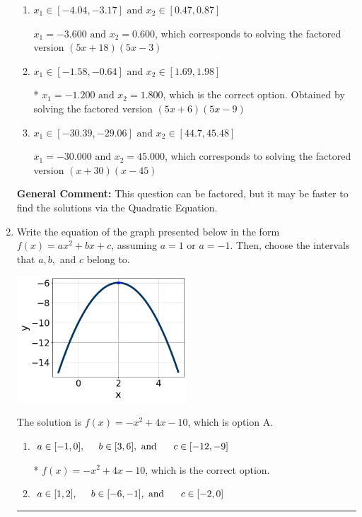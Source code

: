 \documentclass{extbook}[14pt]
\newcommand{\litem}[1]{\item #1

\rule{\textwidth}{0.4pt}}
\begin{document}
\begin{enumerate}
{\begin{enumerate}[label=\Alph*.]
$x_1 = -0.600 \text{ and } x_2 = 3.600$, which corresponds to solving the factored version $(5x + 3)(5x -18)$
\item \( x_1 \in [-4.04, -3.17] \text{ and } x_2 \in [0.47, 0.87] \)

$x_1 = -3.600 \text{ and } x_2 = 0.600$, which corresponds to solving the factored version $(5x + 18)(5x -3)$
\item \( x_1 \in [-1.58, -0.64] \text{ and } x_2 \in [1.69, 1.98] \)

* $x_1 = -1.200 \text{ and } x_2 = 1.800$, which is the correct option. Obtained by solving the factored version $(5x + 6)(5x -9)$
\item \( x_1 \in [-30.39, -29.06] \text{ and } x_2 \in [44.7, 45.48] \)

$x_1 = -30.000 \text{ and } x_2 = 45.000$, which corresponds to solving the factored version $(x + 30)(x -45)$
\end{enumerate}

\textbf{General Comment:} This question can be factored, but it may be faster to find the solutions via the Quadratic Equation.
}
\litem{
Write the equation of the graph presented below in the form $f(x)=ax^2+bx+c$, assuming  $a=1$ or $a=-1$. Then, choose the intervals that $a, b,$ and $c$ belong to.

\begin{center}
    \includegraphics[width=0.5\textwidth]{../Figures/quadraticGraphToEquationCopyA.png}
\end{center}


The solution is \( f(x) = -x^{2} +4 x -10 \), which is option A.\begin{enumerate}[label=\Alph*.]
\item \( a \in [-1, 0], \hspace*{5mm} b \in [3, 6], \text{ and } \hspace*{5mm} c \in [-12, -9] \)

* $f(x)=-x^{2} +4 x -10$, which is the correct option.
\item \( a \in [1, 2], \hspace*{5mm} b \in [-6, -1], \text{ and } \hspace*{5mm} c \in [-2, 0] \)


\end{enumerate}}
\end{enumerate}
\end{document}
